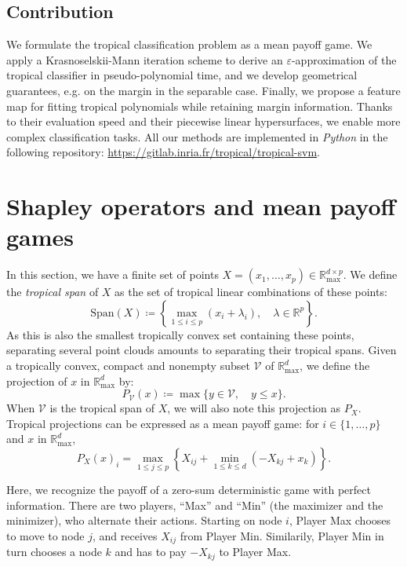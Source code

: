 \documentclass[oneside,UKenglish,a4paper]{amsart}
\numberwithin{equation}{section}
\numberwithin{figure}{section}
\theoremstyle{plain}
\theoremstyle{definition}
\theoremstyle{plain}
\theoremstyle{remark}
\theoremstyle{plain}
\theoremstyle{definition}
\theoremstyle{definition}
\begin{document}
\subsection*{Contribution}

We formulate the tropical classification problem as a mean payoff game. We apply a Krasnoselskii-Mann iteration scheme to derive an $\varepsilon$-approximation of the tropical classifier in pseudo-polynomial time, and we develop geometrical guarantees, e.g. on the margin in the separable case. Finally, we propose a feature map for fitting tropical polynomials while retaining margin information. Thanks to their evaluation speed and their piecewise linear hypersurfaces, we enable more complex classification tasks. All our methods are implemented in \emph{Python} in the following repository: \url{https://gitlab.inria.fr/tropical/tropical-svm}.

\section{Shapley operators and mean payoff games}

In this section, we have a finite set of points $X=(x_{1},\ldots,x_{p})\in\mathbb{R}_{\text{max}}^{d\times p}$.
We define the \emph{tropical span} of $X$ as the set of tropical
linear combinations of these points:
\[
\text{Span}(X)\coloneqq\left\{\max_{1\le i\le p}(x_{i}+\lambda_{i}),\quad\lambda\in\mathbb{R}^{p}\right\}.
\]
As this is also the smallest tropically convex set containing these
points, separating several point clouds amounts to separating their
tropical spans. Given a tropically convex, compact and nonempty subset $\mathcal{V}$
of $\mathbb{R}_{\max}^{d}$, we define the projection of
$x$ in $\mathbb{R}_{\max}^{d}$ by:
\[
P_{\mathcal{V}}(x)\coloneqq\max\{y\in \mathcal{V},\quad y\le x\}.
\]
When $\mathcal{V}$ is the tropical span of $X$, we will also note
this projection as $P_{X}$. Tropical projections
can be expressed as a mean payoff game: for $i\in\{1,\ldots, p\}$ and $x$ in $\mathbb{R}_{\max}^{d}$,   \cite{Maclagan2015}
\begin{equation*}
P_{X}(x)_{i}=\max_{1\le j\le p}\left\{X_{ij}+\min_{1\le k \le d}(-X_{kj}+x_{k})\right\}.
\end{equation*}

Here, we recognize the payoff of a zero-sum deterministic game with perfect
information. There are two players, ``Max'' and ``Min'' (the maximizer
and the minimizer), who alternate their actions. Starting on node
$i$, Player Max chooses to move to node $j$, and receives $X_{ij}$
from Player Min. Similarily, Player Min in turn chooses a node $k$
and has to pay $-X_{kj}$ to Player Max.
\end{document}
